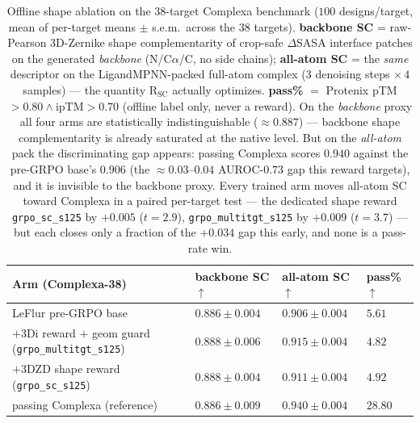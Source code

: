 \documentclass[11pt]{article}
\newcommand{\R}{\mathrm{R}}
\newcommand{\SC}{\mathrm{SC}}
\newcommand{\ttk}[1]{\texttt{\small #1}}
\begin{document}
\begin{table}[htbp]
\centering
{\renewcommand{\arraystretch}{1.2}%
\begin{tabular}{@{}>{\raggedright\arraybackslash}p{5.4cm}
                    >{\centering\arraybackslash}p{2.3cm}
                    >{\centering\arraybackslash}p{2.4cm}
                    >{\centering\arraybackslash}p{1.7cm}@{}}
\toprule
\textbf{Arm (Complexa-38)} & \textbf{backbone SC} $\uparrow$ & \textbf{all-atom SC} $\uparrow$ & \textbf{pass\%} $\uparrow$\\
\midrule
LeFlur pre-GRPO base                                        & $0.886\pm0.004$ & $0.906\pm0.004$ & $5.61$\\
$+$3Di reward $+$ geom guard (\ttk{grpo\_multitgt\_s125})   & $0.888\pm0.006$ & $0.915\pm0.004$ & $4.82$\\
\rowcolor{aTint}$+$3DZD shape reward (\ttk{grpo\_sc\_s125})  & $0.888\pm0.004$ & $0.911\pm0.004$ & $4.92$\\
passing Complexa (reference)                                & $0.886\pm0.009$ & $\mathbf{0.940\pm0.004}$ & $28.80$\\
\bottomrule
\end{tabular}}
\caption{Offline shape ablation on the $38$-target Complexa benchmark ($100$ designs/target, mean
of per-target means $\pm$ s.e.m.\ across the $38$ targets). \textbf{backbone SC} = raw-Pearson
3D-Zernike shape complementarity of crop-safe $\Delta$SASA interface patches on the generated
\emph{backbone} (N/C$\alpha$/C, no side chains); \textbf{all-atom SC} = the \emph{same} descriptor
on the LigandMPNN-packed full-atom complex ($3$ denoising steps $\times\,4$ samples) --- the
quantity $\R_{\SC}$ actually optimizes. \textbf{pass\%} $=$ Protenix pTM$>\!0.80\wedge$ipTM$>\!0.70$
(offline label only, never a reward). On the \emph{backbone} proxy all four arms are statistically
indistinguishable ($\approx\!0.887$) --- backbone shape complementarity is already saturated at the
native level. But on the \emph{all-atom} pack the discriminating gap appears: passing Complexa
scores $0.940$ against the pre-GRPO base's $0.906$ (the $\approx\!0.03$--$0.04$ AUROC-$0.73$ gap
this reward targets), and it is invisible to the backbone proxy. Every trained arm moves all-atom
SC toward Complexa in a paired per-target test --- the dedicated shape reward \ttk{grpo\_sc\_s125}
by $+0.005$ ($t\!=\!2.9$), \ttk{grpo\_multitgt\_s125} by $+0.009$ ($t\!=\!3.7$) --- but each closes
only a fraction of the $+0.034$ gap this early, and none is a pass-rate win.}
\label{tab:shapeablation}
\end{table}
\end{document}
